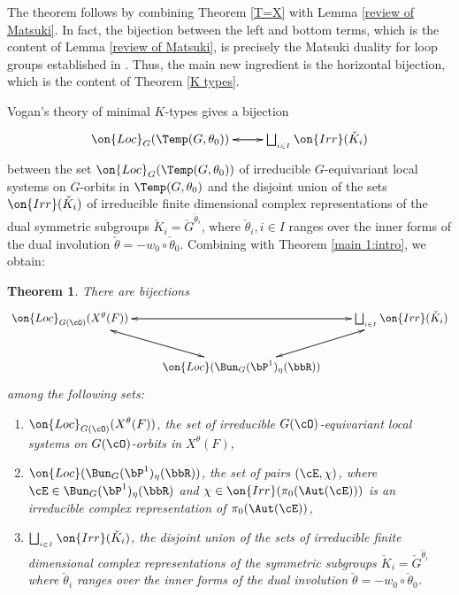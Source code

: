 \documentclass[12pt]{amsart}
\newtheorem{thm}{Theorem}
\theoremstyle{remark}
\begin{document}
The theorem follows by combining Theorem \ref{T=X} with Lemma \ref{review of Matsuki}. In fact, the bijection between the left and bottom terms, which is the content of Lemma \ref{review of Matsuki}, is precisely the Matsuki duality for loop groups established in \cite{CY}. Thus, the main new ingredient is the horizontal bijection, which is the content of Theorem \ref{K types}.

Vogan's theory of minimal $K$-types \cite{V} gives a bijection
\[\xymatrix{
\on{Loc}_G(\Temp(G,\theta_0))\ar[r]&\bigsqcup_{_{i\in I}}\on{Irr}(\check K_i)\ar[l]}\]
between the set
 $\on{Loc}_G(\Temp(G,\theta_0))$ of irreducible $G$-equivariant local systems on $G$-orbits in $\Temp(G,\theta_0)$
and the disjoint union of the sets
$\on{Irr}(\check K_i)$  of irreducible finite dimensional complex representations of the dual symmetric subgroups 
$\check K_i=\check G^{\check\theta_i}$, where $\check\theta_i,i\in I$ ranges over the  inner forms of the dual involution $\check\theta=-w_0\circ\check\theta_0$.
Combining with Theorem \ref{main 1:intro}, we obtain:


\begin{thm}\label{main 2:into}
There are bijections 
\begin{equation}\label{real groups}
    \xymatrix{\on{Loc}_{G(\cO)}(X^\theta(F))\ar[rr]\ar[dr]&&\bigsqcup_{_{i\in I}}\on{Irr}(\check K_i)\ar[dl]\ar[ll]\\
&\on{Loc}(\Bun_G(\bP^1)_{\eta}(\bbR))\ar[ul]\ar[ur]&}
\end{equation}
among the following sets:
\begin{enumerate}
    \item $\on{Loc}_{G(\cO)}(X^\theta(F))$,  the set of irreducible
   $G(\cO)$-equivariant local systems on 
 $G(\cO)$-orbits in $X^\theta(F)$,
 \item $\on{Loc}(\Bun_G(\bP^1)_{\eta}(\bbR))$,  the set
of  pairs $(\cE,\chi)$, where $\cE\in \Bun_G(\bP^1)_{\eta}(\bbR)$ 
and $\chi\in\on{Irr}(\pi_0(\Aut(\cE)))$ is an irreducible
complex representation of $\pi_0(\Aut(\cE))$,
\item $\bigsqcup_{_{i\in I}}\on{Irr}(\check K_i)$, 
the disjoint union of the sets
of irreducible finite dimensional complex representations 
of the  symmetric subgroups 
$\check K_i=\check G^{\check\theta_i}$
where \(\check\theta_i\) ranges over the  inner forms of the dual involution $\check\theta=-w_0\circ\check\theta_0$.
\end{enumerate}

\end{thm}
\end{document}
